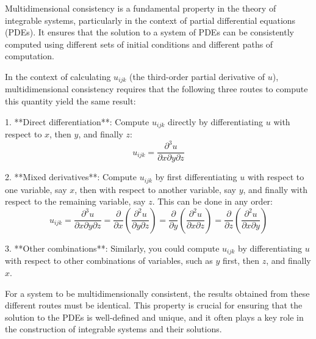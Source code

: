 Multidimensional consistency is a fundamental property in the theory of integrable systems, particularly in the context of partial differential equations (PDEs). It ensures that the solution to a system of PDEs can be consistently computed using different sets of initial conditions and different paths of computation.

In the context of calculating \( u_{ijk} \) (the third-order partial derivative of \( u \)), multidimensional consistency requires that the following three routes to compute this quantity yield the same result:

1. **Direct differentiation**: Compute \( u_{ijk} \) directly by differentiating \( u \) with respect to \( x \), then \( y \), and finally \( z \):
   \[
   u_{ijk} = \frac{\partial^3 u}{\partial x \partial y \partial z}
   \]

2. **Mixed derivatives**: Compute \( u_{ijk} \) by first differentiating \( u \) with respect to one variable, say \( x \), then with respect to another variable, say \( y \), and finally with respect to the remaining variable, say \( z \). This can be done in any order:
   \[
   u_{ijk} = \frac{\partial^3 u}{\partial x \partial y \partial z} = \frac{\partial}{\partial x} \left( \frac{\partial^2 u}{\partial y \partial z} \right) = \frac{\partial}{\partial y} \left( \frac{\partial^2 u}{\partial x \partial z} \right) = \frac{\partial}{\partial z} \left( \frac{\partial^2 u}{\partial x \partial y} \right)
   \]

3. **Other combinations**: Similarly, you could compute \( u_{ijk} \) by differentiating \( u \) with respect to other combinations of variables, such as \( y \) first, then \( z \), and finally \( x \).

For a system to be multidimensionally consistent, the results obtained from these different routes must be identical. This property is crucial for ensuring that the solution to the PDEs is well-defined and unique, and it often plays a key role in the construction of integrable systems and their solutions.